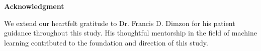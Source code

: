 \begin{center}
	\textbf{Acknowledgment}
\end{center}

We extend our heartfelt gratitude to Dr. Francis D. Dimzon for his patient guidance throughout this study. His thoughtful mentorship in the field of machine learning contributed to the foundation and direction of this study. 